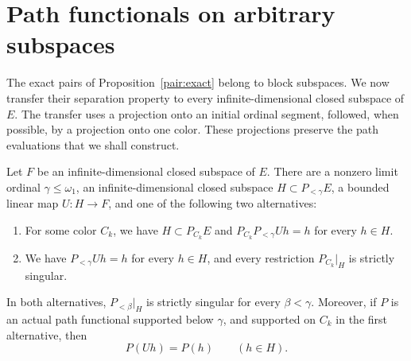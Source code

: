 \section{Path functionals on arbitrary subspaces}\label{branch:section}\label{sec:branches}

The exact pairs of Proposition~\ref{pair:exact} belong to block subspaces.
We now transfer their separation property to every infinite-dimensional
closed subspace of $E$.  The transfer uses a projection onto an initial
ordinal segment, followed, when possible, by a projection onto one color.
These projections preserve the path evaluations that we shall construct.

\begin{lemma}\label{branch:reduction}
Let $F$ be an infinite-dimensional closed subspace of $E$.  There are a
nonzero limit ordinal $\gamma\leq\omega_1$, an infinite-dimensional closed
subspace $H\subset P_{<\gamma}E$, a bounded linear map $U:H\to F$, and one
of the following two alternatives:
\begin{enumerate}
\item For some color $C_k$, we have $H\subset P_{C_k}E$ and
      $P_{C_k}P_{<\gamma}Uh=h$ for every $h\in H$.
\item We have $P_{<\gamma}Uh=h$ for every $h\in H$, and every restriction
      $P_{C_k}|_H$ is strictly singular.
\end{enumerate}
In both alternatives, $P_{<\beta}|_H$ is strictly singular for every
$\beta<\gamma$.  Moreover, if $P$ is an actual path functional supported
below $\gamma$, and supported on $C_k$ in the first alternative, then
\begin{equation}\label{branch:lift-identity}
                         P(Uh)=P(h)\qquad(h\in H).
\end{equation}
\end{lemma}

